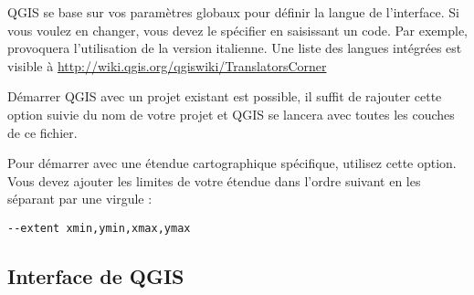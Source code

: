 
QGIS se base sur vos paramètres globaux pour définir la langue de l'interface. Si vous voulez en changer, vous devez le spécifier en saisissant un code. 
Par exemple,  provoquera l'utilisation de la version italienne. Une liste des langues intégrées est visible à \url{http://wiki.qgis.org/qgiswiki/TranslatorsCorner} 


Démarrer QGIS avec un projet existant est possible, il suffit de rajouter cette option suivie du nom de votre projet et QGIS se lancera avec toutes les couches de ce fichier.


Pour démarrer avec une étendue cartographique spécifique, utilisez cette option. Vous devez ajouter les limites de votre étendue dans l'ordre suivant en les séparant par une virgule :
\begin{verbatim}
--extent xmin,ymin,xmax,ymax
\end{verbatim}


\subsection{Interface de QGIS}
\label{label_qgismainwindow}

